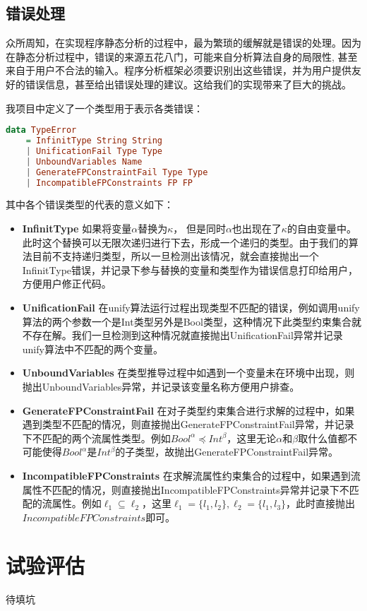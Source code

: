 \documentclass[12pt, titlepage]{article}
\begin{document}
	\subsection{错误处理}
	众所周知，在实现程序静态分析的过程中，最为繁琐的缓解就是错误的处理。因为在静态分析过程中，错误的来源五花八门，可能来自分析算法自身的局限性, 甚至来自于用户不合法的输入。程序分析框架必须要识别出这些错误，并为用户提供友好的错误信息，甚至给出错误处理的建议。这给我们的实现带来了巨大的挑战。
	
	我项目中定义了一个类型用于表示各类错误：
	\begin{lstlisting}[language=haskell]
data TypeError 
    = InfinitType String String
    | UnificationFail Type Type
    | UnboundVariables Name
    | GenerateFPConstraintFail Type Type
    | IncompatibleFPConstraints FP FP
	\end{lstlisting}
	其中各个错误类型的代表的意义如下：
	\begin{itemize}
		\item \textbf{InfinitType} 如果将变量$\alpha$替换为$\kappa$， 但是同时$\alpha$也出现在了$\kappa$的自由变量中。此时这个替换可以无限次递归进行下去，形成一个递归的类型。由于我们的算法目前不支持递归类型，所以一旦检测出该情况，就会直接抛出一个InfinitType错误，并记录下参与替换的变量和类型作为错误信息打印给用户，方便用户修正代码。
		\item \textbf{UnificationFail} 在unify算法运行过程出现类型不匹配的错误，例如调用unify算法的两个参数一个是Int类型另外是Bool类型，这种情况下此类型约束集合就不存在解。我们一旦检测到这种情况就直接抛出UnificationFail异常并记录unify算法中不匹配的两个变量。
		\item \textbf{UnboundVariables} 在类型推导过程中如遇到一个变量未在环境中出现，则抛出UnboundVariables异常，并记录该变量名称方便用户排查。
		\item \textbf{GenerateFPConstraintFail}  在对子类型约束集合进行求解的过程中，如果遇到类型不匹配的情况，则直接抛出GenerateFPConstraintFail异常，并记录下不匹配的两个流属性类型。例如$Bool^{\alpha}\preceq Int^{\beta}$，这里无论$\alpha$和$\beta$取什么值都不可能使得$Bool^{\alpha}$是$Int^{\beta}$的子类型，故抛出GenerateFPConstraintFail异常。
		\item \textbf{IncompatibleFPConstraints} 在求解流属性约束集合的过程中，如果遇到流属性不匹配的情况，则直接抛出IncompatibleFPConstraints异常并记录下不匹配的流属性。例如$\ell_1\subseteq\ell_2$，这里$\ell_1=\{l_1, l_2\}, \ell_2 = \{l_1, l_3\}$，此时直接抛出$IncompatibleFPConstraints$即可。
	\end{itemize}
	\newpage
	\section{试验评估}
	待填坑
	\newpage
\end{document}
